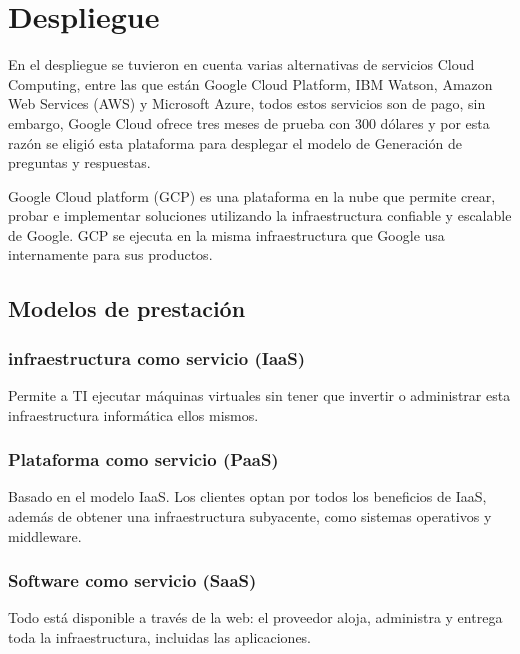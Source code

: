 \documentclass[../Main.tex]{subfiles}
\begin{document}
    \section{Despliegue}
    \begin{justify}
    En el despliegue se tuvieron en cuenta varias alternativas de servicios Cloud Computing, entre las que están Google Cloud Platform, IBM Watson, Amazon Web Services (AWS) y Microsoft Azure, todos estos servicios son de pago, sin embargo, Google Cloud ofrece tres meses de prueba con 300 dólares y por esta razón se eligió esta plataforma para desplegar el modelo de Generación de preguntas y respuestas.
    
    Google Cloud platform (GCP) es una plataforma en la nube que permite crear, probar e implementar soluciones utilizando la infraestructura confiable y escalable de Google. GCP se ejecuta en la misma infraestructura que Google usa internamente para sus productos.
    \end{justify}
    
    \subsection{Modelos de prestación}
    \subsubsection{infraestructura como servicio (IaaS)}
        \begin{justify}
         Permite a TI ejecutar máquinas virtuales sin tener que invertir o administrar esta infraestructura informática ellos mismos. 
        \end{justify}
    
    \subsubsection{Plataforma como servicio (PaaS)}
        \begin{justify}
         Basado en el modelo IaaS. Los clientes optan por todos los beneficios de IaaS, además de obtener una infraestructura subyacente, como sistemas operativos y middleware.
        \end{justify}
        
    \subsubsection{Software como servicio (SaaS)}
        \begin{justify}
         Todo está disponible a través de la web: el proveedor aloja, administra y entrega toda la infraestructura, incluidas las aplicaciones. 
        \end{justify}
        
\end{document}
